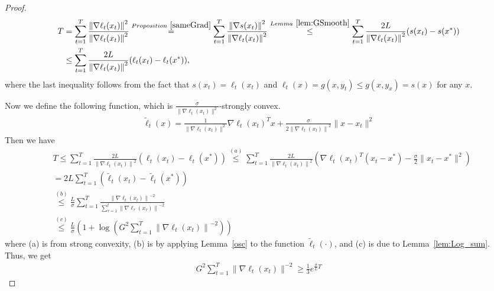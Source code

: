\documentclass[final,12pt]{colt2018} %
\newcommand{\norm}[1]{\left\lVert#1\right\rVert}
\newcommand{\norme}[1]{\norm{#1}}
\newcommand{\yx}[1]{y_{#1}}
\newcommand{\pr}[1]{\left(#1\right)}
\begin{document}
\begin{proof}
\begin{align}
T &= \sum_{t=1}^T \frac{\norme{ \nabla \ell_t(x_t)}^2}{\norme{ \nabla \ell_t(x_t)}^2}
\overset{Proposition~\ref{sameGrad}}{ = }\sum_{t=1}^T \frac{\norme{\nabla s(x_t)}^2}{\norme{ \nabla \ell_t(x_t)}^2}
\overset{Lemma~\ref{lem:GSmooth}}{ \le} \sum_{t=1}^T \frac{2L}{\norme{ \nabla \ell_t(x_t)}^2} (s(x_t) - s(x^*))\\
&\le \sum_{t=1}^T \frac{2L}{\norme{ \nabla \ell_t(x_t)}^2} (\ell_t(x_t) - \ell_t(x^*))\label{eq:normal},
\end{align}
where the last inequality follows from the fact that $s(x_t) = \ell_t(x_t)$ and $\ell_t(x) = g(x,y_t) \le g(x,\yx{x}) = s(x)$ for any $x$.

Now we define the following function, which is $\frac{\sigma}{\|\nabla \ell_t(x_t)\|^{2}}$-strongly convex.
\begin{align} \label{tf}
\tilde{\ell}_t(x) = \frac{1}{\| \nabla \ell_t(x_t)\|^{2} }\nabla \ell_t(x_t)^T x + \frac{\sigma}{2\norme{\nabla \ell_t(x_t)}^{2}} \| x - x_t\|^2
\end{align}
Then we have
\begin{equation} \label{tmyt}
\begin{aligned}
& T \leq \sum_{t=1}^T \frac{2L}{\norme{ \nabla \ell_t(x_t)}^2} (\ell_t(x_t) - \ell_t(x^*))
\overset{(a)}{\le} \sum_{t=1}^T \frac{2 L}{\norme{ \nabla \ell_t(x_t)}^2} (\nabla \ell_t(x_t)^T (x_t - x^*) - \frac{\sigma}{2} \| x_t - x^*\|^2)\\
&= 2L \sum_{t=1}^T \pr{\tilde{\ell}_t(x_t) - \tilde{\ell}_t (x^*)}\\
&\overset{(b)}{\le} \frac{L}{\sigma} \sum_{t=1}^T \frac{\norme{\nabla \ell_t(x_t)}^{-2}}{\sum_{\tau = 1}^t \norme{\nabla \ell_\tau(x_\tau)}^{-2}}\\
&\overset{(c)}{\le} \frac{L}{\sigma} \pr{1 + \log \pr{G^2 \sum_{t=1}^T \norme{\nabla \ell_t(x_t)}^{-2}}}
\end{aligned}
\end{equation}
where (a) is from strong convexity, (b) is by applying Lemma~\ref{osc} to the function $\tilde{\ell}_t(\cdot)$, and (c) is due to Lemma~\ref{lem:Log_sum}. 
Thus, we get
\begin{align} \label{eq:exp}
G^2 \sum_{t=1}^T \| \nabla \ell_t(x_t) \|^{-2} \ge \frac{1}{3} e^{\frac{\sigma}{L}T}
\end{align}
\end{proof}
\end{document}
